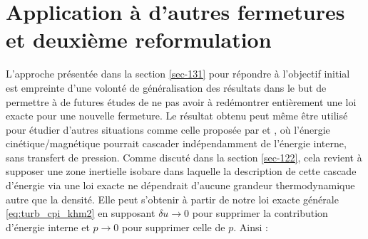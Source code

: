 \section{ Application à d'autres fermetures et deuxième reformulation}
\label{sec-133}

L'approche présentée dans la section \ref{sec-131} pour répondre à l'objectif initial est empreinte d'une volonté de généralisation des résultats dans le but de permettre à de futures études de ne pas avoir à redémontrer entièrement une loi exacte pour une nouvelle fermeture. Le résultat obtenu peut même être utilisé pour étudier d'autres situations comme celle proposée par  \cite{aluie_conservative_2012} et \cite{hellinger_spectral_2021}, où l'énergie cinétique/magnétique pourrait cascader indépendamment de l'énergie interne, sans transfert de pression. Comme discuté dans la section \ref{sec-122}, cela revient à supposer une zone inertielle isobare dans laquelle la description de cette cascade d'énergie via une loi exacte ne dépendrait d'aucune grandeur thermodynamique autre que la densité. Elle peut s'obtenir à partir de notre loi exacte générale \eqref{eq:turb_cpi_khm2} en supposant $\delta u \rightarrow 0$ pour supprimer la contribution d'énergie interne et $p \rightarrow 0$ pour supprimer celle de $p$. Ainsi : 
